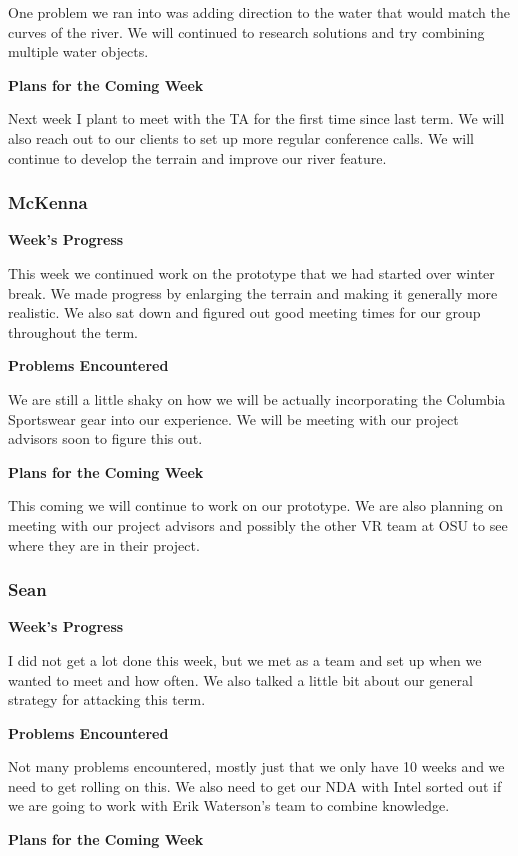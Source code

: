 \documentclass[10pt,journal,compsoc,onecolumn, draftclsnofoot]{IEEEtran}
\begin{document}
One problem we ran into was adding direction to the water that would match the curves of the river. We will continued to research solutions and try combining multiple water objects.

\noindent \textbf{Plans for the Coming Week}

Next week I plant to meet with the TA for the first time since last term. We will also reach out to our clients to set up more regular conference calls. We will continue to develop the terrain and improve our river feature.

\subsubsection{McKenna}
\noindent \textbf{Week's Progress}

This week we continued work on the prototype that we had started over winter break. We made progress by enlarging the terrain and making it generally more realistic. We also sat down and figured out good meeting times for our group throughout the term.

\noindent \textbf{Problems Encountered}

We are still a little shaky on how we will be actually incorporating the Columbia Sportswear gear into our experience. We will be meeting with our project advisors soon to figure this out.

\noindent \textbf{Plans for the Coming Week}

This coming we will continue to work on our prototype. We are also planning on meeting with our project advisors and possibly the other VR team at OSU to see where they are in their project.

\subsubsection{Sean}
\noindent \textbf{Week's Progress}

I did not get a lot done this week, but we met as a team and set up when we wanted to meet and how often.  We also talked a little bit about our general strategy for attacking this term.

\noindent \textbf{Problems Encountered}

Not many problems encountered, mostly just that we only have 10 weeks and we need to get rolling on this.  We also need to get our NDA with Intel sorted out if we are going to work with Erik Waterson's team to combine knowledge.

\noindent \textbf{Plans for the Coming Week}
\end{document}
